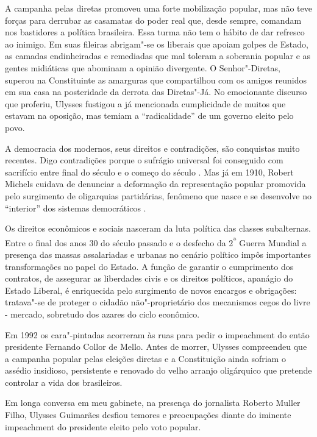 A campanha pelas diretas promoveu uma forte mobilização popular, mas não
teve forças para derrubar as casamatas do poder real que, desde sempre,
comandam nos bastidores a política brasileira. Essa turma não tem o
hábito de dar refresco ao inimigo. Em suas fileiras abrigam"-se os
liberais que apoiam golpes de Estado, as camadas endinheiradas e
remediadas que mal toleram a soberania popular e as gentes midiáticas
que abominam a opinião divergente. O Senhor"-Diretas, superou na
Constituinte as amarguras que compartilhou com os amigos reunidos em sua
casa na posteridade da derrota das Diretas"-Já. No emocionante discurso
que proferiu, Ulysses fustigou a já mencionada cumplicidade de muitos
que estavam na oposição, mas temiam a ``radicalidade'' de um governo
eleito pelo povo.

A democracia dos modernos, seus direitos e contradições, são conquistas
muito recentes. Digo contradições porque o sufrágio universal foi
conseguido com sacrifício entre final do século  e o começo do século
. Mas já em 1910, Robert Michels cuidava de denunciar a deformação da
representação popular promovida pelo surgimento de oligarquias
partidárias, fenômeno que nasce e se desenvolve no ``interior'' dos
sistemas democráticos .

Os direitos econômicos e sociais nasceram da luta política das classes
subalternas. Entre o final dos anos 30 do século passado e o desfecho da
2\textsuperscript{ª} Guerra Mundial a presença das massas assalariadas e
urbanas no cenário político impôs importantes transformações no papel do
Estado. A função de garantir o cumprimento dos contratos, de assegurar
as liberdades civis e os direitos políticos, apanágio do Estado Liberal,
é enriquecida pelo surgimento de novos encargos e obrigações: tratava"-se
de proteger o cidadão não"-proprietário dos mecanismos cegos do livre -
mercado, sobretudo dos azares do ciclo econômico.

Em 1992 os cara"-pintadas acorreram às ruas para pedir o impeachment do
então presidente Fernando Collor de Mello. Antes de morrer, Ulysses
compreendeu que a campanha popular pelas eleições diretas e a
Constituição ainda sofriam o assédio insidioso, persistente e renovado
do velho arranjo oligárquico que pretende controlar a vida dos
brasileiros.

Em longa conversa em meu gabinete, na presença do jornalista Roberto
Muller Filho, Ulysses Guimarães desfiou temores e preocupações diante do
iminente impeachment do presidente eleito pelo voto popular.

